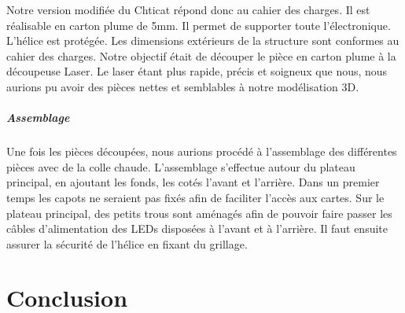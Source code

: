 \documentclass[a4paper,12pt]{book}
\begin{document}
				Notre version modifiée du Chticat répond donc au cahier des charges. Il est réalisable en carton plume de 5mm. Il permet de supporter toute l'électronique. L'hélice est protégée. Les dimensions extérieurs de la structure sont conformes au cahier des charges.
				Notre objectif était de découper le pièce en carton plume à la découpeuse Laser. Le laser étant plus rapide, précis et soigneux que nous, nous aurions pu avoir des pièces nettes et semblables à notre modélisation 3D.
				\paragraph{Assemblage} Une fois les pièces découpées, nous aurions procédé à l'assemblage des différentes pièces avec de la colle chaude. L'assemblage s'effectue autour du plateau principal, en ajoutant les fonds, les cotés l'avant et l'arrière. Dans un premier temps les capots ne seraient pas fixés afin de faciliter l'accès aux cartes. Sur le plateau principal, des petits trous sont aménagés afin de pouvoir faire passer les câbles d'alimentation des LEDs disposées à l'avant et à l'arrière. Il faut ensuite assurer la sécurité de l'hélice en fixant du grillage.
				
	\chapter{Conclusion}
	
	
	
	
	\listoffigures
	\lstlistoflistings
	 
	
	
\end{document}
